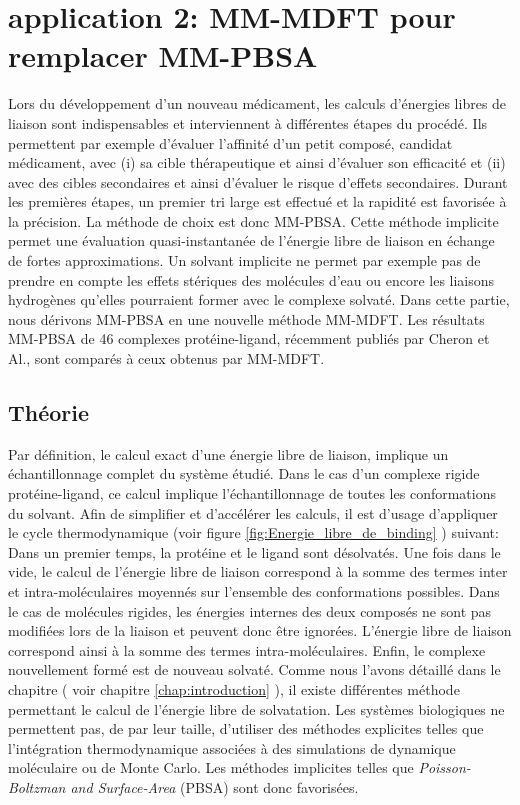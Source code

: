 \clearpage
\section{application 2: MM-MDFT pour remplacer MM-PBSA}
Lors du développement d'un nouveau médicament, les calculs d'énergies libres de liaison sont indispensables et interviennent à différentes étapes du procédé. Ils permettent par exemple d'évaluer l'affinité d'un petit composé, candidat médicament, avec (i) sa cible thérapeutique et ainsi d'évaluer son efficacité et (ii) avec des cibles secondaires et ainsi d'évaluer le risque d'effets secondaires. Durant les premières étapes, un premier tri large est effectué et la rapidité est favorisée à la précision. La méthode de choix est donc MM-PBSA\cite{genheden_mm/pbsa_2015}. Cette méthode implicite permet une évaluation quasi-instantanée de l'énergie libre de liaison en échange de fortes approximations. Un solvant implicite ne permet par exemple pas de prendre en compte les effets stériques des molécules d'eau ou encore les liaisons hydrogènes qu'elles pourraient former avec le complexe solvaté. Dans cette partie, nous dérivons MM-PBSA en une nouvelle méthode MM-MDFT. Les résultats MM-PBSA de 46 complexes protéine-ligand, récemment publiés par Cheron et Al.\cite{cheron_effect_2017}, sont comparés à ceux obtenus par MM-MDFT.

\subsection{Théorie}
Par définition, le calcul exact d'une énergie libre de liaison, implique un échantillonnage complet du système étudié. Dans le cas d'un complexe rigide protéine-ligand, ce calcul implique l'échantillonnage de toutes les conformations du solvant. Afin de simplifier et d’accélérer les calculs, il est d'usage d'appliquer le cycle thermodynamique (voir figure \ref{fig:Energie_libre_de_binding} ) suivant: Dans un premier temps, la protéine et le ligand sont désolvatés. Une fois dans le vide, le calcul de l'énergie libre de liaison correspond à la somme des termes inter et intra-moléculaires moyennés sur l'ensemble des conformations possibles. Dans le cas de molécules rigides, les énergies internes des deux composés ne sont pas modifiées lors de la liaison et peuvent donc être ignorées. L'énergie libre de liaison correspond ainsi à la somme des termes intra-moléculaires. Enfin, le complexe nouvellement formé est de nouveau solvaté. Comme nous l'avons détaillé dans le chapitre ( voir chapitre \ref{chap:introduction} ), il existe différentes méthode permettant le calcul de l'énergie libre de solvatation. Les systèmes biologiques ne permettent pas, de par leur taille, d'utiliser des méthodes explicites telles que l'intégration thermodynamique associées à des simulations de dynamique moléculaire ou de Monte Carlo. Les méthodes implicites telles que \textit{Poisson-Boltzman and Surface-Area} (PBSA) sont donc favorisées.




